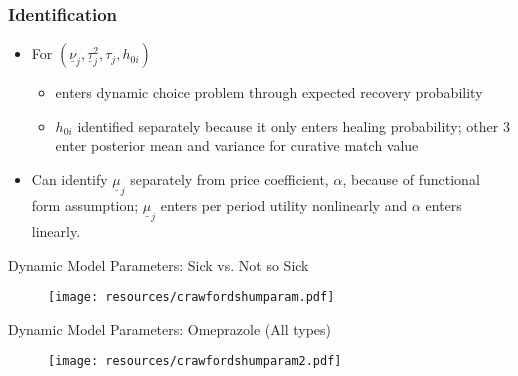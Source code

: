 \begin{frame}
\frametitle{Identification}

\begin{itemize}
\item For $(\underline{\nu }_{j},\underline{\tau }_{j}^{2},\tau _{j},h_{0i})$

\begin{itemize}
\item enters dynamic choice problem through expected recovery probability

\item $h_{0i}$ identified separately because it only enters healing
probability; other 3 enter posterior mean and variance for curative match
value
\end{itemize}

\item Can identify $\underline{\mu }_{j}$ separately from price coefficient, 
$\alpha $, because of functional form assumption; $\underline{\mu }_{j}$
enters per period utility nonlinearly and $\alpha $ enters linearly.
\end{itemize}
\end{frame}


\begin{frame}{Dynamic Model Parameters: Sick vs. Not so Sick}
\begin{figure}[htbp]
\begin{center}
\texttt{[image: resources/crawfordshumparam.pdf]}
\label{default}
\end{center}
\end{figure}
\end{frame}

\begin{frame}{Dynamic Model Parameters: Omeprazole (All types)}
\begin{figure}[htbp]
\begin{center}
\texttt{[image: resources/crawfordshumparam2.pdf]}
\label{default}
\end{center}
\end{figure}
\end{frame}

